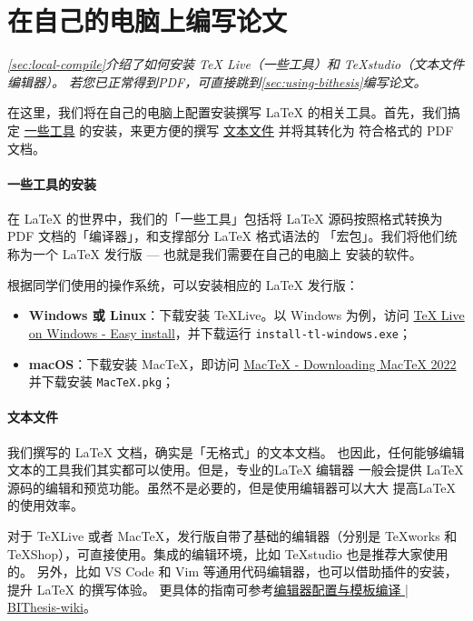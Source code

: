 \section{在自己的电脑上编写论文}

\textit{
\cref{sec:local-compile}介绍了如何安装 TeX Live（一些工具）和 TeXstudio（文本文件编辑器）。
若您已正常得到PDF，可直接跳到\cref{sec:using-bithesis}编写论文。
}

在这里，我们将在自己的电脑上配置安装撰写 \LaTeX{} 的相关工具。首先，我们搞定
\underline{一些工具} 的安装，来更方便的撰写 \underline{文本文件} 并将其转化为
符合格式的 PDF 文档。

\paragraph{一些工具的安装} 在 \LaTeX{} 的世界中，我们的「一些工具」包括将
\LaTeX{} 源码按照格式转换为 PDF 文档的「编译器」，和支撑部分 \LaTeX{} 格式语法的
「宏包」。我们将他们统称为一个 \LaTeX{} 发行版 --- 也就是我们需要在自己的电脑上
安装的软件。

根据同学们使用的操作系统，可以安装相应的 \LaTeX{} 发行版：

\begin{itemize}[noitemsep]
  \item \textbf{Windows 或 Linux}：下载安装 \TeX{}Live。以 Windows 为例，访问
  \href{https://www.tug.org/texlive/windows.html}{TeX Live on Windows - Easy
  install}，并下载运行 \texttt{install-tl-windows.exe}；
  \item \textbf{macOS}：下载安装 Mac\TeX{}，即访问
  \href{https://www.tug.org/mactex/mactex-download.html}{MacTeX - Downloading
  MacTeX 2022} 并下载安装 \texttt{MacTeX.pkg}；
\end{itemize}

\paragraph{文本文件} 我们撰写的 \LaTeX{} 文档，确实是「无格式」的文本文档。
也因此，任何能够编辑文本的工具我们其实都可以使用。但是，专业的\LaTeX{} 编辑器
一般会提供 \LaTeX{} 源码的编辑和预览功能。虽然不是必要的，但是使用编辑器可以大大
提高\LaTeX{} 的使用效率。

对于 \TeX{}Live 或者 Mac\TeX，发行版自带了基础的编辑器（分别是 \TeX{}works 和
\TeX{}Shop），可直接使用。集成的编辑环境，比如 \TeX{}studio 也是推荐大家使用的。
另外，比如 VS Code 和 Vim 等通用代码编辑器，也可以借助插件的安装，提升 \LaTeX{}
的撰写体验。
更具体的指南可参考\href{https://bithesis.bitnp.net/guide/configure-and-compile.html}{编辑器配置与模板编译 | BIThesis-wiki}。

